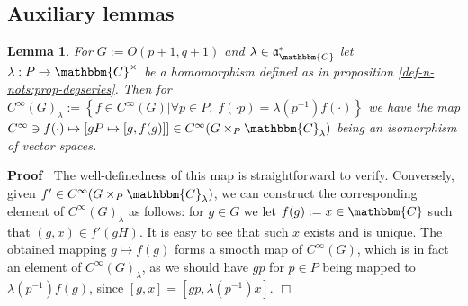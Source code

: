 \documentclass{article}
\newcommand{\assign}{:=}
\newenvironment{proof}{\noindent\textbf{Proof\ }}{\hspace*{\fill}$\Box$\medskip}
\numberwithin{definition}{section}
\newtheorem{lemma}{Lemma}
\numberwithin{lemma}{section}
\numberwithin{proposition}{section}
{\theorembodyfont{\rmfamily}\newtheorem{remark}{Remark}
\numberwithin{remark}{section}
}
\begin{document}
\subsection{Auxiliary lemmas}

\begin{lemma}
  \label{sol:lem-unfold}For $G \assign O ( p + 1, q + 1)$ and $\lambda \in
  \mathfrak{a}_{\mathbbm{C}}^{\ast}$ let $\lambda : P \rightarrow
  \mathbbm{C}^{\times}$ be a homomorphism defined as in proposition
  \ref{def-n-nots:prop-degseries}. Then for $C^{\infty} ( G)_{\lambda} \assign
  \left\{ f \in C^{\infty} ( G) | \forall p \in P, \; f ( \cdot p) = \lambda (
  p^{- 1}) f ( \cdot) \right\}$ we have the map $C^{\infty} \ni f ( \cdot)
  \mapsto [ g P \mapsto [ g, f ( g)]] \in C^{\infty} ( G \times_P
  \mathbbm{C}_{\lambda})$ being an isomorphism of vector spaces.
\end{lemma}

\begin{proof}
  The well-definedness of this map is straightforward to verify. Conversely,
  given $f' \in C^{\infty} ( G \times_P \mathbbm{C}_{\lambda})$, we can
  construct the corresponding element of $C^{\infty} ( G)_{\lambda}$ as
  follows: for $g \in G$ we let $f ( g) \assign x \in \mathbbm{C}$ such that
  $( g, x) \in f' ( g H)$. It is easy to see that such $x$ exists and is
  unique. The obtained mapping $g \mapsto f ( g)$ forms a smooth map of
  $C^{\infty} ( G)$, which is in fact an element of $C^{\infty} (
  G)_{\lambda}$, as we should have $g p$ for $p \in P$ being mapped to
  $\lambda ( p^{- 1}) f ( g)$, since $[ g, x] = [ g p, \lambda ( p^{- 1}) x]$.
\end{proof}
\end{document}
